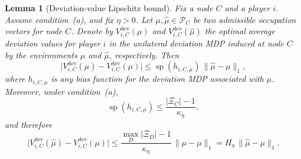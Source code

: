 \documentclass[12pt]{article}
\newtheorem{lemma}[theorem]{Lemma}
\theoremstyle{definition}
\newcommand{\1}{\mathbf{1}}
\begin{document}
\begin{lemma}[Deviation-value Lipschitz bound]\label{lem:dev-value-lipschitz}
Fix a node \(C\) and a player \(i\). Assume condition~(a), and fix \(\eta>0\). Let \(\mu,\widehat\mu\in\mathcal P_C\) be two admissible occupation vectors for node \(C\). Denote by \(V^{\mathrm{dev}}_{i,C}(\mu)\) and \(V^{\mathrm{dev}}_{i,C}(\widehat\mu)\) the optimal average deviation values for player \(i\) in the unilateral deviation MDP induced at node \(C\) by the environments \(\mu\) and \(\widehat\mu\), respectively. Then
\[
\bigl|V^{\mathrm{dev}}_{i,C}(\widehat\mu)-V^{\mathrm{dev}}_{i,C}(\mu)\bigr|
\le \operatorname{sp}(h_{i,C,\mu})\,\|\widehat\mu-\mu\|_1,
\]
where \(h_{i,C,\mu}\) is any bias function for the deviation MDP associated with \(\mu\). Moreover, under condition~(a),
\[
\operatorname{sp}(h_{i,C,\mu})\le \frac{|\Xi_C|-1}{\kappa_\eta},
\]
and therefore
\[
\bigl|V^{\mathrm{dev}}_{i,C}(\widehat\mu)-V^{\mathrm{dev}}_{i,C}(\mu)\bigr|
\le \frac{\max_{D}|\Xi_D|-1}{\kappa_\eta}\,\|\widehat\mu-\mu\|_1
=H_\eta\,\|\widehat\mu-\mu\|_1.
\]
\end{lemma}
\end{document}
